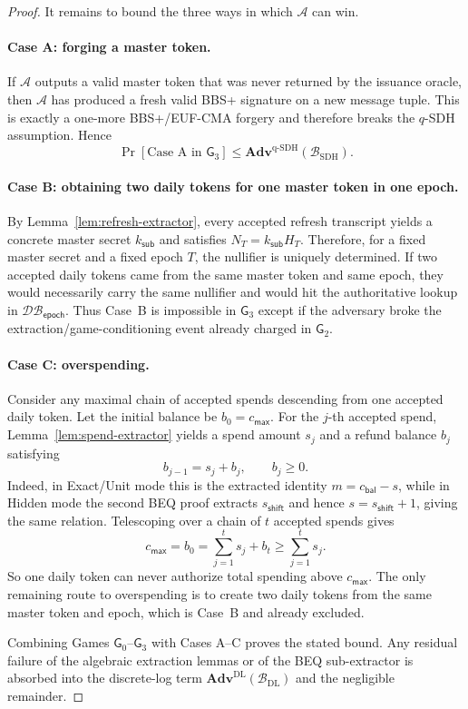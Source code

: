 \documentclass[11pt]{article}
\theoremstyle{definitionstyle}
\theoremstyle{plain}
\newcommand{\advantage}[1]{\mathbf{Adv}^{\mathrm{#1}}}
\newcommand{\DB}{\mathcal{DB}}
\begin{document}
\begin{proof}
It remains to bound the three ways in which $\mathcal{A}$ can win.

\paragraph{Case A: forging a master token.} If $\mathcal{A}$ outputs a valid master token that was never returned by the issuance oracle, then $\mathcal{A}$ has produced a fresh valid BBS+ signature on a new message tuple. This is exactly a one-more BBS+/EUF-CMA forgery and therefore breaks the $q$-SDH assumption. Hence
\[
\Pr[\text{Case A in }\mathsf{G}_3] \le \advantage{q\text{-}SDH}(\mathcal{B}_{\text{SDH}}).
\]

\paragraph{Case B: obtaining two daily tokens for one master token in one epoch.} By Lemma~\ref{lem:refresh-extractor}, every accepted refresh transcript yields a concrete master secret $k_{\mathsf{sub}}$ and satisfies $N_T = k_{\mathsf{sub}} H_T$. Therefore, for a fixed master secret and a fixed epoch $T$, the nullifier is uniquely determined. If two accepted daily tokens came from the same master token and same epoch, they would necessarily carry the same nullifier and would hit the authoritative lookup in $\DB_{\mathsf{epoch}}$. Thus Case~B is impossible in $\mathsf{G}_3$ except if the adversary broke the extraction/game-conditioning event already charged in $\mathsf{G}_2$.

\paragraph{Case C: overspending.} Consider any maximal chain of accepted spends descending from one accepted daily token. Let the initial balance be $b_0=c_{\mathsf{max}}$. For the $j$-th accepted spend, Lemma~\ref{lem:spend-extractor} yields a spend amount $s_j$ and a refund balance $b_j$ satisfying
\[
b_{j-1} = s_j + b_j,
\qquad
b_j \ge 0.
\]
Indeed, in Exact/Unit mode this is the extracted identity $m=c_{\mathsf{bal}}-s$, while in Hidden mode the second BEQ proof extracts $s_{\mathsf{shift}}$ and hence $s=s_{\mathsf{shift}}+1$, giving the same relation. Telescoping over a chain of $t$ accepted spends gives
\[
c_{\mathsf{max}} = b_0 = \sum_{j=1}^{t} s_j + b_t \ge \sum_{j=1}^{t} s_j.
\]
So one daily token can never authorize total spending above $c_{\mathsf{max}}$. The only remaining route to overspending is to create two daily tokens from the same master token and epoch, which is Case~B and already excluded.

Combining Games $\mathsf{G}_0$--$\mathsf{G}_3$ with Cases A--C proves the stated bound. Any residual failure of the algebraic extraction lemmas or of the BEQ sub-extractor is absorbed into the discrete-log term $\advantage{DL}(\mathcal{B}_{\text{DL}})$ and the negligible remainder.
\end{proof}
\end{document}
